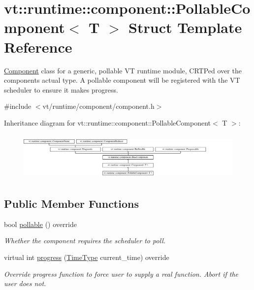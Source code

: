 \hypertarget{structvt_1_1runtime_1_1component_1_1_pollable_component}{}\section{vt\+:\+:runtime\+:\+:component\+:\+:Pollable\+Component$<$ T $>$ Struct Template Reference}
\label{structvt_1_1runtime_1_1component_1_1_pollable_component}


{\ttfamily \hyperlink{structvt_1_1runtime_1_1component_1_1_component}{Component}} class for a generic, pollable VT runtime module, C\+R\+TP\textquotesingle{}ed over the component\textquotesingle{}s actual type. A pollable component will be registered with the VT scheduler to ensure it makes progress.  




{\ttfamily \#include $<$vt/runtime/component/component.\+h$>$}

Inheritance diagram for vt\+:\+:runtime\+:\+:component\+:\+:Pollable\+Component$<$ T $>$\+:\begin{figure}[H]
\begin{center}
\leavevmode
\includegraphics[height=2.422145cm]{structvt_1_1runtime_1_1component_1_1_pollable_component}
\end{center}
\end{figure}
\subsection*{Public Member Functions}
\begin{DoxyCompactItemize}
\item 
bool \hyperlink{structvt_1_1runtime_1_1component_1_1_pollable_component_a8ad6cfbc184ed9862cae5304605fe025}{pollable} () override
\begin{DoxyCompactList}\small\item\em Whether the component requires the scheduler to poll. \end{DoxyCompactList}\item 
virtual int \hyperlink{structvt_1_1runtime_1_1component_1_1_pollable_component_a51939e8b7e895a377c10c6767034396b}{progress} (\hyperlink{namespacevt_a876a9d0cd5a952859c72de8a46881442}{Time\+Type} current\+\_\+time) override
\begin{DoxyCompactList}\small\item\em Override progress function to force user to supply a real function. Abort if the user does not. \end{DoxyCompactList}\end{DoxyCompactItemize}
